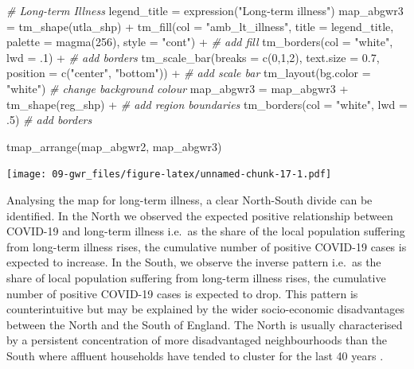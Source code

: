 \documentclass[
]{book}
\newenvironment{Shaded}{\begin{snugshade}}{\end{snugshade}}
\newcommand{\AttributeTok}[1]{\textcolor[rgb]{0.77,0.63,0.00}{#1}}
\newcommand{\CommentTok}[1]{\textcolor[rgb]{0.56,0.35,0.01}{\textit{#1}}}
\newcommand{\DecValTok}[1]{\textcolor[rgb]{0.00,0.00,0.81}{#1}}
\newcommand{\FloatTok}[1]{\textcolor[rgb]{0.00,0.00,0.81}{#1}}
\newcommand{\FunctionTok}[1]{\textcolor[rgb]{0.00,0.00,0.00}{#1}}
\newcommand{\NormalTok}[1]{#1}
\newcommand{\OtherTok}[1]{\textcolor[rgb]{0.56,0.35,0.01}{#1}}
\newcommand{\SpecialCharTok}[1]{\textcolor[rgb]{0.00,0.00,0.00}{#1}}
\newcommand{\StringTok}[1]{\textcolor[rgb]{0.31,0.60,0.02}{#1}}
\begin{document}
\begin{Shaded}
\begin{Highlighting}[]
  \CommentTok{\# Long{-}term Illness}
\NormalTok{legend\_title }\OtherTok{=} \FunctionTok{expression}\NormalTok{(}\StringTok{"Long{-}term illness"}\NormalTok{)}
\NormalTok{map\_abgwr3 }\OtherTok{=} \FunctionTok{tm\_shape}\NormalTok{(utla\_shp) }\SpecialCharTok{+}
  \FunctionTok{tm\_fill}\NormalTok{(}\AttributeTok{col =} \StringTok{"amb\_lt\_illness"}\NormalTok{, }\AttributeTok{title =}\NormalTok{ legend\_title, }\AttributeTok{palette =} \FunctionTok{magma}\NormalTok{(}\DecValTok{256}\NormalTok{), }\AttributeTok{style =} \StringTok{"cont"}\NormalTok{) }\SpecialCharTok{+} \CommentTok{\# add fill}
  \FunctionTok{tm\_borders}\NormalTok{(}\AttributeTok{col =} \StringTok{"white"}\NormalTok{, }\AttributeTok{lwd =}\NormalTok{ .}\DecValTok{1}\NormalTok{)  }\SpecialCharTok{+} \CommentTok{\# add borders}
  \FunctionTok{tm\_scale\_bar}\NormalTok{(}\AttributeTok{breaks =} \FunctionTok{c}\NormalTok{(}\DecValTok{0}\NormalTok{,}\DecValTok{1}\NormalTok{,}\DecValTok{2}\NormalTok{), }\AttributeTok{text.size =} \FloatTok{0.7}\NormalTok{, }\AttributeTok{position =}  \FunctionTok{c}\NormalTok{(}\StringTok{"center"}\NormalTok{, }\StringTok{"bottom"}\NormalTok{)) }\SpecialCharTok{+} \CommentTok{\# add scale bar}
  \FunctionTok{tm\_layout}\NormalTok{(}\AttributeTok{bg.color =} \StringTok{"white"}\NormalTok{) }\CommentTok{\# change background colour}
\NormalTok{map\_abgwr3 }\OtherTok{=}\NormalTok{ map\_abgwr3 }\SpecialCharTok{+} \FunctionTok{tm\_shape}\NormalTok{(reg\_shp) }\SpecialCharTok{+} \CommentTok{\# add region boundaries}
  \FunctionTok{tm\_borders}\NormalTok{(}\AttributeTok{col =} \StringTok{"white"}\NormalTok{, }\AttributeTok{lwd =}\NormalTok{ .}\DecValTok{5}\NormalTok{) }\CommentTok{\# add borders}

\FunctionTok{tmap\_arrange}\NormalTok{(map\_abgwr2, map\_abgwr3)}
\end{Highlighting}
\end{Shaded}

\texttt{[image: 09-gwr\_files/figure-latex/unnamed-chunk-17-1.pdf]}

Analysing the map for long-term illness, a clear North-South divide can be identified. In the North we observed the expected positive relationship between COVID-19 and long-term illness i.e.~as the share of the local population suffering from long-term illness rises, the cumulative number of positive COVID-19 cases is expected to increase. In the South, we observe the inverse pattern i.e.~as the share of local population suffering from long-term illness rises, the cumulative number of positive COVID-19 cases is expected to drop. This pattern is counterintuitive but may be explained by the wider socio-economic disadvantages between the North and the South of England. The North is usually characterised by a persistent concentration of more disadvantaged neighbourhoods than the South where affluent households have tended to cluster for the last 40 years \citep{rowe2020policy}.
\end{document}
